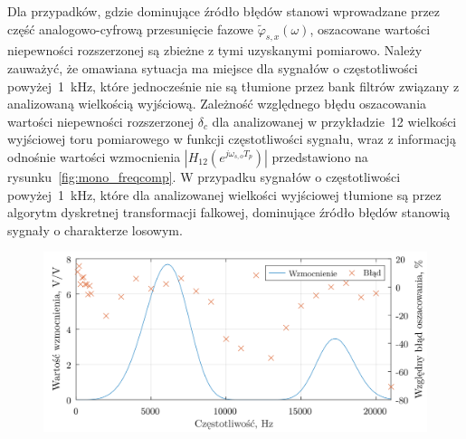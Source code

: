 Dla przypadków, gdzie dominujące źródło błędów stanowi wprowadzane przez część analogowo-cyfrową przesunięcie fazowe $\tilde{\varphi}_{s,x}(\omega)$, oszacowane wartości niepewności rozszerzonej są zbieżne z tymi uzyskanymi pomiarowo. Należy zauważyć, że omawiana sytuacja ma miejsce dla sygnałów o częstotliwości powyżej~\qty{1}{kHz}, które jednocześnie nie są tłumione przez bank filtrów związany z analizowaną wielkością wyjściową. Zależność względnego błędu oszacowania wartości niepewności rozszerzonej $\delta_{c}$ dla analizowanej w przykładzie~\qty{12}{\numTej} wielkości wyjściowej toru pomiarowego w funkcji częstotliwości sygnału, wraz z informacją odnośnie wartości wzmocnienia $|H_{12}(e^{j \omega_{s,o} T_{p}})|$ przedstawiono na rysunku~\ref{fig:mono_freqcomp}. W przypadku sygnałów o częstotliwości powyżej~\qty{1}{kHz}, które dla analizowanej wielkości wyjściowej tłumione są przez algorytm dyskretnej transformacji falkowej, dominujące źródło błędów stanowią sygnały o charakterze losowym.

\begin{figure}[htb!]
\begin{center}
\includegraphics{obrazki/mono_freqcomp}
\end{center}
\end{figure}

